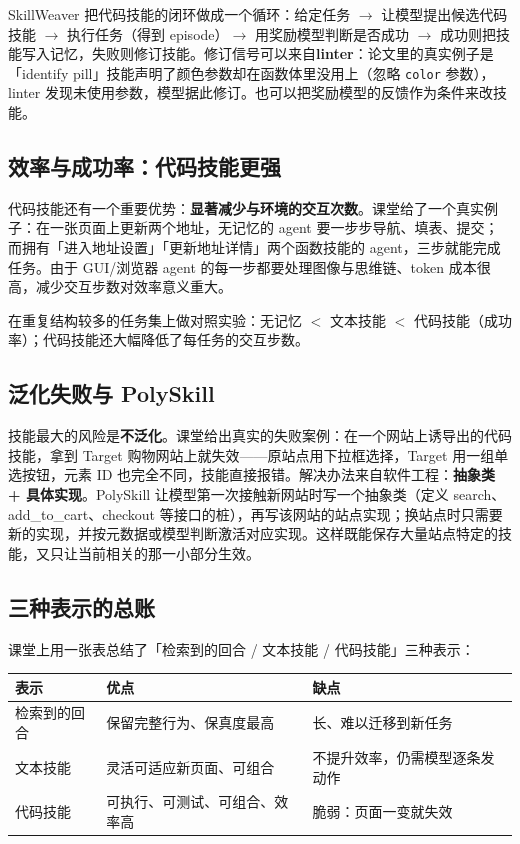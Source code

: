 ﻿\documentclass[a4paper]{article}
\begin{document}
SkillWeaver 把代码技能的闭环做成一个循环：给定任务 $\rightarrow$ 让模型提出候选代码技能 $\rightarrow$ 执行任务（得到 episode）$\rightarrow$ 用奖励模型判断是否成功 $\rightarrow$ 成功则把技能写入记忆，失败则修订技能。修订信号可以来自\textbf{linter}：论文里的真实例子是「identify pill」技能声明了颜色参数却在函数体里没用上（忽略 \texttt{color} 参数），linter 发现未使用参数，模型据此修订。也可以把奖励模型的反馈作为条件来改技能。

\subsection{效率与成功率：代码技能更强}

代码技能还有一个重要优势：\textbf{显著减少与环境的交互次数}。课堂给了一个真实例子：在一张页面上更新两个地址，无记忆的 agent 要一步步导航、填表、提交；而拥有「进入地址设置」「更新地址详情」两个函数技能的 agent，三步就能完成任务。由于 GUI/浏览器 agent 的每一步都要处理图像与思维链、token 成本很高，减少交互步数对效率意义重大。

在重复结构较多的任务集上做对照实验：无记忆 $<$ 文本技能 $<$ 代码技能（成功率）；代码技能还大幅降低了每任务的交互步数。

\subsection{泛化失败与 PolySkill}

技能最大的风险是\textbf{不泛化}。课堂给出真实的失败案例：在一个网站上诱导出的代码技能，拿到 Target 购物网站上就失效——原站点用下拉框选择，Target 用一组单选按钮，元素 ID 也完全不同，技能直接报错。解决办法来自软件工程：\textbf{抽象类 + 具体实现}。PolySkill 让模型第一次接触新网站时写一个抽象类（定义 search、add\_to\_cart、checkout 等接口的桩），再写该网站的站点实现；换站点时只需要新的实现，并按元数据或模型判断激活对应实现。这样既能保存大量站点特定的技能，又只让当前相关的那一小部分生效。

\subsection{三种表示的总账}

课堂上用一张表总结了「检索到的回合 / 文本技能 / 代码技能」三种表示：

\begin{center}
\begin{tabular}{p{2.4cm}p{4.6cm}p{4.6cm}}
\toprule
表示 & 优点 & 缺点 \\
\midrule
检索到的回合 & 保留完整行为、保真度最高 & 长、难以迁移到新任务 \\
文本技能 & 灵活可适应新页面、可组合 & 不提升效率，仍需模型逐条发动作 \\
代码技能 & 可执行、可测试、可组合、效率高 & 脆弱：页面一变就失效 \\
\bottomrule
\end{tabular}
\end{center}
\end{document}
